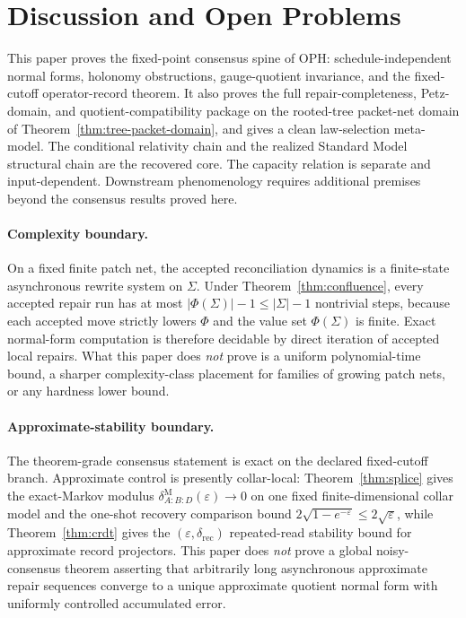 \documentclass[11pt]{article}
\theoremstyle{remark}
\theoremstyle{plain}
\begin{document}
\section{Discussion and Open Problems}

This paper proves the fixed-point consensus spine of OPH: schedule-independent normal forms,
holonomy obstructions, gauge-quotient invariance, and the fixed-cutoff operator-record theorem.
It also proves the full repair-completeness, Petz-domain, and quotient-compatibility package on
the rooted-tree packet-net domain of Theorem~\ref{thm:tree-packet-domain}, and gives a clean
law-selection meta-model. The conditional relativity chain and the realized Standard Model
structural chain are the recovered core. The capacity relation is separate and input-dependent.
Downstream phenomenology requires additional premises beyond the consensus results proved here.

\paragraph{Complexity boundary.}
On a fixed finite patch net, the accepted reconciliation dynamics is a finite-state asynchronous
rewrite system on \(\Sigma\). Under Theorem~\ref{thm:confluence}, every accepted repair run has at
most \(|\Phi(\Sigma)|-1\le |\Sigma|-1\) nontrivial steps, because each accepted move strictly
lowers \(\Phi\) and the value set \(\Phi(\Sigma)\) is finite. Exact normal-form computation is
therefore decidable by direct iteration of accepted local repairs. What this paper does
\emph{not} prove is a uniform polynomial-time bound, a sharper complexity-class placement for
families of growing patch nets, or any hardness lower bound.

\paragraph{Approximate-stability boundary.}
The theorem-grade consensus statement is exact on the declared fixed-cutoff branch. Approximate
control is presently collar-local: Theorem~\ref{thm:splice} gives the exact-Markov modulus
\(\delta^{\mathrm M}_{A:B:D}(\varepsilon)\to0\) on one fixed finite-dimensional collar model and
the one-shot recovery comparison bound \(2\sqrt{1-e^{-\varepsilon}}\le 2\sqrt{\varepsilon}\),
while Theorem~\ref{thm:crdt} gives the \((\varepsilon,\delta_{\mathrm{rec}})\) repeated-read
stability bound for approximate record projectors. This paper does \emph{not} prove a
global noisy-consensus theorem asserting that arbitrarily long asynchronous approximate repair
sequences converge to a unique approximate quotient normal form with uniformly controlled
accumulated error.
\end{document}
